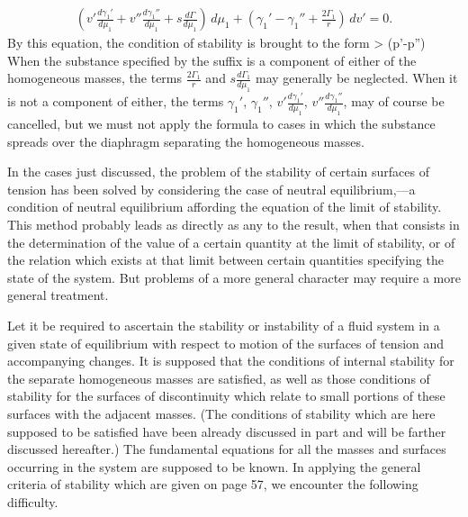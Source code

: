\documentclass[12pt]{memoir}
\begin{document}
{\begin{gather}
\left(v' \frac{d\gamma_1'}{d\mu_1} +v'' \frac{d\gamma_1''}{d\mu_1}+ s \frac{d\Gamma}{d\mu_1} \right)\, d\mu_1  +\left( \gamma_1' - \gamma_1'' + \frac{2\Gamma_1}{r} \right)\, dv' = 0. \label{539} \end{gather}
By this equation, the condition of stability is brought to the form
\eqs {} > (p'-p'')   \label{540} \eqe
When the substance specified by the suffix is a component of either
of the homogeneous masses, the terms $\frac{2\Gamma_1}{r}$ and $s\frac{d\Gamma_1}{d\mu_1} $ may generally be neglected. When it is not a component of either, the terms $\gamma_1'$, $\gamma_1''$, $v' \frac{d\gamma_1'}{d\mu_1}$, $v'' \frac{d\gamma_1''}{d\mu_1}$, may of course be cancelled, but we must not apply the formula to cases in which the substance spreads over the diaphragm separating the homogeneous masses.

In the cases just discussed, the problem of the stability of certain surfaces of tension has been solved by considering the case of neutral equilibrium,---a condition of neutral equilibrium affording the equation of the limit of stability. This method probably leads as directly as any to the result, when that consists in the determination of the value of a certain quantity at the limit of stability, or of the relation which exists at that limit between certain quantities specifying the state of the system. But problems of a more general character may require a more general treatment.

Let it be required to ascertain the stability or instability of a fluid system in a given state of equilibrium with respect to motion of the surfaces of tension and accompanying changes. It is supposed that the conditions of internal stability for the separate homogeneous masses are satisfied, as well as those conditions of stability for the surfaces of discontinuity which relate to small portions of these surfaces with the adjacent masses. (The conditions of stability which are here supposed to be satisfied have been already discussed in part and will be farther discussed hereafter.) The fundamental equations for all the masses and surfaces occurring in the system are supposed to be known. In applying the general criteria of stability which are given on page 57, we encounter the following difficulty.

}
\end{document}

